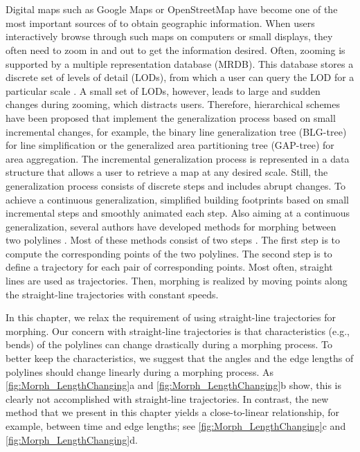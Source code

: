 \chapter[\MorphToCTitle]{\MorphTitle}
\label{chap:Morph}


Digital maps such as Google Maps or OpenStreetMap have become 
one of the most important sources of to obtain geographic information. 
When users interactively browse through such maps on computers 
or small displays, they often need to zoom in and out to get the 
information desired. Often, zooming is supported by a multiple 
representation database (MRDB). 
This database stores a discrete set of levels of detail (LODs), 
from which a user can query the LOD for a 
particular scale \parencite{Hampe2004multiple}. 
A small set of LODs, however, leads to 
large and sudden changes during zooming, 
which distracts users.
Therefore, hierarchical schemes have been proposed that 
implement the generalization process 
based on small incremental changes, 
for example, the binary line generalization tree 
(BLG-tree) \parencite{vanOosterom2005} 
for line simplification 
or the generalized area partitioning tree (GAP-tree)
\parencite{vanOosterom1995GAPTree} 
for area aggregation. 
The incremental generalization process is 
represented in a data structure 
that allows a user to retrieve a map at any desired scale. 
Still, the generalization process 
consists of discrete steps and includes abrupt changes. 
To achieve a continuous generalization, 
\textcite{Sester2004} simplified building footprints 
based on small incremental steps 
and smoothly animated each step. 
Also aiming at a continuous generalization, 
several authors have developed 
methods for morphing between two polylines
\parencite{Cecconi2003,Noellenburg2008}. 
Most of these methods consist of two steps 
\parencite{Cecconi2003,Noellenburg2008,Peng2012River}. 
The first step is to compute the corresponding points
of the two polylines. 
The second step is to define a trajectory for each 
pair of corresponding points. 
Most often, straight lines are used as trajectories.
Then, morphing is realized by moving points 
along the straight-line trajectories with constant speeds.

In this chapter, we relax the requirement of using
straight-line trajectories for morphing.
Our concern with straight-line trajectories is that 
characteristics (e.g., bends) of the polylines 
can change drastically during a morphing process. 
To better keep the characteristics, 
we suggest that the angles and the edge lengths of polylines 
should change linearly during a morphing process. 
As \figs\ref{fig:Morph_LengthChanging}a and 
\ref{fig:Morph_LengthChanging}b show, this is clearly 
not accomplished with straight-line trajectories. In contrast, 
the new method that we present in this chapter yields a 
close-to-linear relationship, for example, between time and edge 
lengths; see \figs\ref{fig:Morph_LengthChanging}c and 
\ref{fig:Morph_LengthChanging}d.


